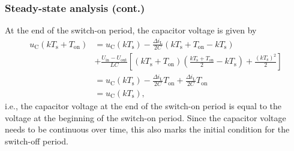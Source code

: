 \begin{frame}
    \frametitle{Steady-state analysis (cont.)}
    At the end of the switch-on period, the capacitor voltage is given by
    \begin{equation}
        \begin{split}
            u_\mathrm{C}(k T_\mathrm{s} + T_\mathrm{on}) &= u_\mathrm{C}(k T_\mathrm{s}) -\frac{\Delta i_\mathrm{L}}{2 C}(k T_\mathrm{s} + T_\mathrm{on}- kT_\mathrm{s}) \\&+ \frac{U_\mathrm{in}-U_\mathrm{out}}{LC} \left[(k T_\mathrm{s} + T_\mathrm{on})(\frac{k T_\mathrm{s} + T_\mathrm{on}}{2}-kT_\mathrm{s}) + \frac{(kT_\mathrm{s})^2}{2}\right]\\
            &= u_\mathrm{C}(k T_\mathrm{s}) - \frac{\Delta i_\mathrm{L}}{2 C}T_\mathrm{on} +\frac{\Delta i_\mathrm{L}}{2 C}T_\mathrm{on}\\
            &= u_\mathrm{C}(k T_\mathrm{s}),
        \end{split}
        \label{eq:capacitor-voltage-switch-on-step-down-converter-end}
    \end{equation}
    i.e., the capacitor voltage at the end of the switch-on period is equal to the voltage at the beginning of the switch-on period. Since the capacitor voltage needs to be continuous over time, this also marks the initial condition for the switch-off period.
\end{frame}

